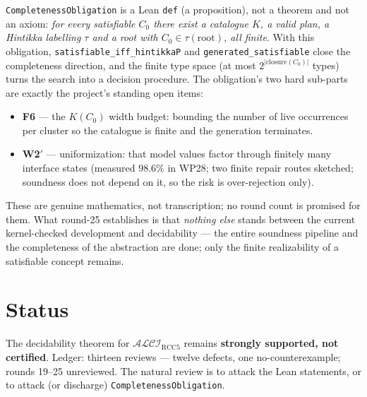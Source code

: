 \documentclass[11pt]{article}
\newcommand{\ALCIRCC}{\mathcal{ALCI}_{\mathrm{RCC5}}}
\newcommand{\code}[1]{\texttt{#1}}
\begin{document}
\code{CompletenessObligation} is a Lean \code{def} (a proposition), not
a theorem and not an axiom: \emph{for every satisfiable $C_0$ there
exist a catalogue $K$, a valid plan, a Hintikka labelling $\tau$ and a
root with $C_0 \in \tau(\text{root})$, all finite}.  With this
obligation, \code{satisfiable\_iff\_hintikkaP} and
\code{generated\_satisfiable} close the completeness direction, and the
finite type space (at most $2^{|\mathrm{closure}(C_0)|}$ types) turns
the search into a decision procedure.  The obligation's two hard
sub-parts are exactly the project's standing open items:
\begin{itemize}[leftmargin=2em]
\item \textbf{F6} --- the $K(C_0)$ width budget: bounding the number
of live occurrences per cluster so the catalogue is finite and the
generation terminates.
\item \textbf{W2$'$} --- uniformization: that model values factor
through finitely many interface states (measured $98.6\%$ in WP28; two
finite repair routes sketched; soundness does not depend on it, so the
risk is over-rejection only).
\end{itemize}
These are genuine mathematics, not transcription; no round count is
promised for them.  What round-25 establishes is that \emph{nothing
else} stands between the current kernel-checked development and
decidability --- the entire soundness pipeline and the completeness of
the abstraction are done; only the finite realizability of a
satisfiable concept remains.

\section{Status}

The decidability theorem for $\ALCIRCC$ remains \textbf{strongly
supported, not certified}.  Ledger: thirteen reviews --- twelve
defects, one no-counterexample; rounds 19--25 unreviewed.  The natural
review is to attack the Lean statements, or to attack (or discharge)
\code{CompletenessObligation}.
\end{document}
